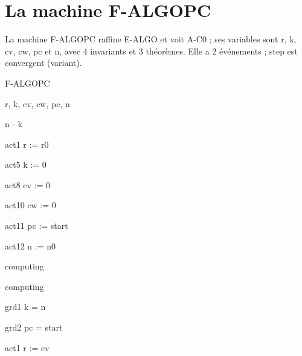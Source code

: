\documentclass[11pt,a4paper]{article}
\begin{document}
\section{La machine F-ALGOPC}

La machine \textsf{F-ALGOPC} raffine \textsf{E-ALGO} et voit \textsf{A-C0} ; ses variables sont \textsf{r}, \textsf{k}, \textsf{cv}, \textsf{cw}, \textsf{pc} et \textsf{n}, avec 4 invariants et 3 théorèmes. Elle a 2 événements ; \textsf{step} est convergent (variant).

\begin{machine}{F-ALGOPC}
  \begin{variables}{r, k, cv, cw, pc, n}
  \end{variables}
  \begin{variant} n - k \end{variant}
  \begin{initialisation}
    \begin{action}{act1} r := r0 \end{action}
    \begin{action}{act5} k := 0 \end{action}
    \begin{action}{act8} cv := 0 \end{action}
    \begin{action}{act10} cw := 0 \end{action}
    \begin{action}{act11} pc := start \end{action}
    \begin{action}{act12} n := n0 \end{action}
  \end{initialisation}
  \begin{event}{computing}
    \begin{refines} computing \end{refines}
    \begin{guard}{grd1} k = n \end{guard}
    \begin{guard}{grd2} pc = start \end{guard}
    \begin{action}{act1} r := cv \end{action}

\end{event}
\end{machine}
\end{document}
